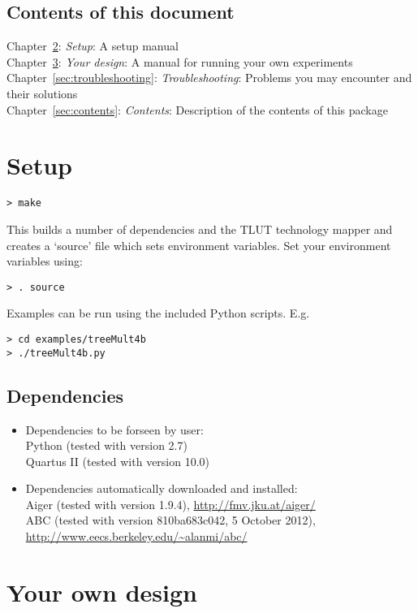 \documentclass[a4paper,oneside]{memoir}
\begin{document}
\section{Contents of this document}
Chapter~\ref{sec:setup}: \emph{Setup}: A setup manual\\
Chapter~\ref{sec:experiment}: \emph{Your design}: A manual for running your own experiments\\
Chapter~\ref{sec:troubleshooting}: \emph{Troubleshooting}: Problems you may encounter and their solutions\\
Chapter~\ref{sec:contents}: \emph{Contents}: Description of the contents of this package


\clearpage
\chapter{Setup}\label{sec:setup}
\begin{lstlisting}
> make
\end{lstlisting}
This builds a number of dependencies and the TLUT technology mapper and creates a `source' file which sets environment variables. Set your environment variables using:
\begin{lstlisting}
> . source
\end{lstlisting}
Examples can be run using the included Python scripts.
E.g.
\begin{lstlisting}
> cd examples/treeMult4b
> ./treeMult4b.py
\end{lstlisting}

\section{Dependencies}
\begin{itemize}
\item Dependencies to be forseen by user:\\
Python (tested with version 2.7)\\
Quartus II (tested with version 10.0)
\item Dependencies automatically downloaded and installed:\\
Aiger (tested with version 1.9.4), \url{http://fmv.jku.at/aiger/}\\
ABC (tested with version 810ba683c042, 5 October 2012), \url{http://www.eecs.berkeley.edu/\~alanmi/abc/}
\end{itemize}

\clearpage
\chapter{Your own design}\label{sec:experiment}
\end{document}
